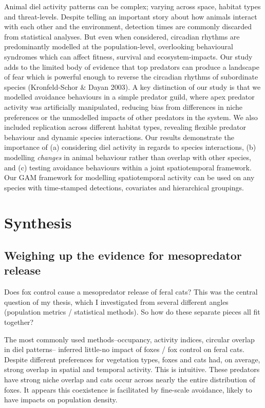 \documentclass[11pt,a4paper,titlepage,twoside,openright]{style/unimelbthesis}
\begin{document}
\begin{mainmatter}
Animal diel activity patterns can be complex; varying across space, habitat types and threat-levels. Despite telling an important story about how animals interact with each other and the environment, detection times are commonly discarded from statistical analyses. But even when considered, circadian rhythms are predominantly modelled at the population-level, overlooking behavioural syndromes which can affect fitness, survival and ecosystem-impacts. Our study adds to the limited body of evidence that top predators can produce a landscape of fear which is powerful enough to reverse the circadian rhythms of subordinate species (Kronfeld-Schor \& Dayan 2003). A key distinction of our study is that we modelled avoidance behaviours in a simple predator guild, where apex predator activity was artificially manipulated, reducing bias from differences in niche preferences or the unmodelled impacts of other predators in the system. We also included replication across different habitat types, revealing flexible predator behaviour and dynamic species interactions. Our results demonstrate the importance of (a) considering diel activity in regards to species interactions, (b) modelling \emph{changes} in animal behaviour rather than overlap with other species, and (c) testing avoidance behaviours within a joint spatiotemporal framework. Our GAM framework for modelling spatiotemporal activity can be used on any species with time-stamped detections, covariates and hierarchical groupings.

\hypertarget{synthesis}{%
\chapter{Synthesis}\label{synthesis}}

\hypertarget{weighing-up-the-evidence-for-mesopredator-release}{%
\section{Weighing up the evidence for mesopredator release}\label{weighing-up-the-evidence-for-mesopredator-release}}

Does fox control cause a mesopredator release of feral cats? This was the central question of my thesis, which I investigated from several different angles (population metrics / statistical methods). So how do these separate pieces all fit together?

The most commonly used methods--occupancy, activity indices, circular overlap in diel patterns-- inferred little-no impact of foxes / fox control on feral cats. Despite different preferences for vegetation types, foxes and cats had, on average, strong overlap in spatial and temporal activity. This is intuitive. These predators have strong niche overlap and cats occur across nearly the entire distribution of foxes. It appears this coexistence is facilitated by fine-scale avoidance, likely to have impacts on population density.


\end{mainmatter}
\end{document}
